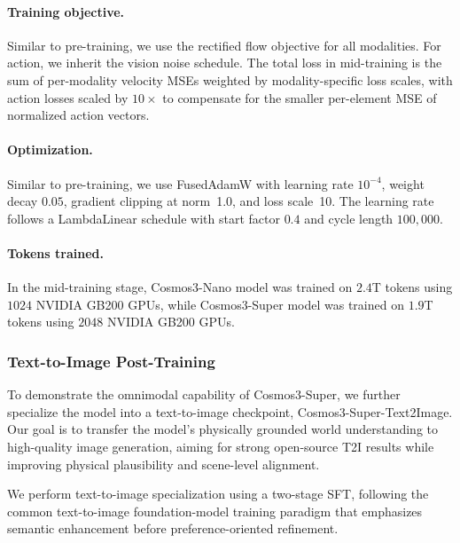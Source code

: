 \paragraph{Training objective.} Similar to pre-training, we use the rectified flow objective for all modalities. For action, we inherit the vision noise schedule. The total loss in mid-training is the sum of per-modality velocity MSEs weighted by modality-specific loss scales, with action losses scaled by $10\times$ to compensate for the smaller per-element MSE of normalized action vectors.

\paragraph{Optimization.}
Similar to pre-training, we use FusedAdamW with learning rate $10^{-4}$, weight decay $0.05$, gradient clipping at norm~1.0, and loss scale~10. The learning rate follows a LambdaLinear schedule with start factor $0.4$ and cycle length $100{,}000$.

\paragraph{Tokens trained.} In the mid-training stage, Cosmos3-Nano model was trained on $2.4$T tokens using $1024$ NVIDIA GB200 GPUs, while Cosmos3-Super model was trained on $1.9$T tokens using $2048$ NVIDIA GB200 GPUs.


\subsubsection{Text-to-Image Post-Training}
\label{sec::t2i_post_train}

To demonstrate the omnimodal capability of Cosmos3-Super, we further specialize the model into a text-to-image checkpoint, Cosmos3-Super-Text2Image. Our goal is to transfer the model's physically grounded world understanding to high-quality image generation, aiming for strong open-source T2I results while improving physical plausibility and scene-level alignment.

We perform text-to-image specialization using a two-stage SFT, following the common text-to-image foundation-model training paradigm that emphasizes semantic enhancement before preference-oriented refinement.

